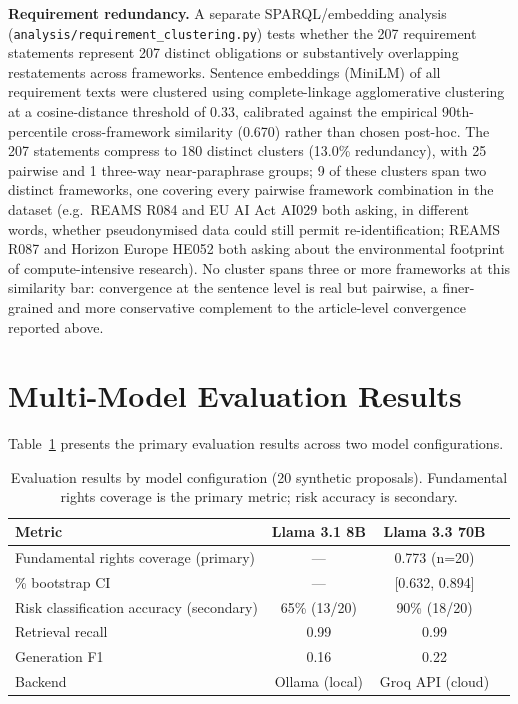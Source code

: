 \textbf{Requirement redundancy.} A separate SPARQL/embedding analysis (\texttt{analysis/requirement\_clustering.py}) tests whether the 207 requirement statements represent 207 distinct obligations or substantively overlapping restatements across frameworks. Sentence embeddings (MiniLM) of all requirement texts were clustered using complete-linkage agglomerative clustering at a cosine-distance threshold of 0.33, calibrated against the empirical 90th-percentile cross-framework similarity (0.670) rather than chosen post-hoc. The 207 statements compress to 180 distinct clusters (13.0\% redundancy), with 25 pairwise and 1 three-way near-paraphrase groups; 9 of these clusters span two distinct frameworks, one covering every pairwise framework combination in the dataset (e.g.\ REAMS R084 and EU AI Act AI029 both asking, in different words, whether pseudonymised data could still permit re-identification; REAMS R087 and Horizon Europe HE052 both asking about the environmental footprint of compute-intensive research). No cluster spans three or more frameworks at this similarity bar: convergence at the sentence level is real but pairwise, a finer-grained and more conservative complement to the article-level convergence reported above.


\section{Multi-Model Evaluation Results}

Table~\ref{tab:model_comparison} presents the primary evaluation results across two model configurations.

\begin{table}[htbp]
\centering
\caption{Evaluation results by model configuration (20 synthetic proposals). Fundamental rights coverage is the primary metric; risk accuracy is secondary.}
\label{tab:model_comparison}
\begin{tabular}{lccc}
\toprule
\textbf{Metric} & \textbf{Llama 3.1 8B} & \textbf{Llama 3.3 70B} \\
\midrule
Fundamental rights coverage (primary) & --- & 0.773 (n=20) \\
\quad 95\% bootstrap CI & --- & [0.632, 0.894] \\
Risk classification accuracy (secondary) & 65\% (13/20) & 90\% (18/20) \\
Retrieval recall & 0.99 & 0.99 \\
Generation F1 & 0.16 & 0.22 \\
Backend & Ollama (local) & Groq API (cloud) \\
\bottomrule
\end{tabular}
\end{table}

